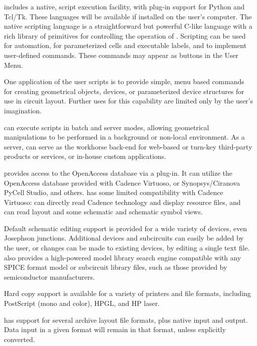 {\Xic} includes a native, script execution facility, with plug-in
support for Python and Tcl/Tk.  These languages will be available if
installed on the user's computer.  The native scripting language is a
straightforward but powerful C-like language with a rich library of
primitives for controlling the operation of {\Xic}.  Scripting can be
used for automation, for parameterized cells and executable labels,
and to implement user-defined commands.  These commands may appear as
buttons in the {\cb User Menu}.

One application of the user scripts is to provide simple, menu based
commands for creating geometrical objects, devices, or parameterized
device structures for use in circuit layout.  Further uses for this
capability are limited only by the user's imagination.

{\Xic} can execute scripts in batch and server modes, allowing
geometrical manipulations to be performed in a background or non-local
environment.  As a server, {\Xic} can serve as the workhorse back-end
for web-based or turn-key third-party products or services, or
in-house custom applications.

\ifoa
{\Xic} provides access to the OpenAccess database via a plug-in.  It
can utilize the OpenAccess database provided with Cadence Virtuoso, or
Synopsys/Ciranova PyCell Studio, and others.  {\Xic} has some limited
compatibility with Cadence Virtuoso:  {\Xic} can directly read Cadence
technology and display resource files, and can read layout and some
schematic and schematic symbol views.
\fi

Default schematic editing support is provided for a wide variety of
devices, even Josephson junctions.  Additional devices and subcircuits
can easily be added by the user, or changes can be made to existing
devices, by editing a single text file.  {\Xic} also provides a
high-powered model library search engine compatible with any SPICE
format model or subcircuit library files, such as those provided by
semiconductor manufacturers.

Hard copy support is available for a variety of printers and file
formats, including PostScript (mono and color), HPGL, and HP laser. 

{\Xic} has support for several archive layout file formats, plus
native input and output.  Data input in a given format will remain in
that format, unless explicitly converted.

